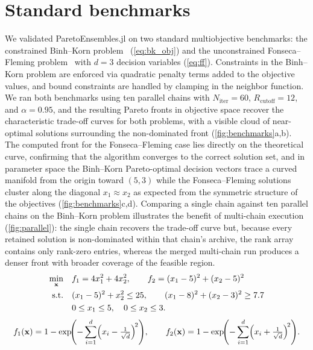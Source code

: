 \documentclass[preprint,review,12pt]{elsarticle}
\begin{document}
\clearpage
\section{Standard benchmarks}\label{sec:si_benchmarks}
We validated ParetoEnsembles.jl on two standard multiobjective benchmarks: the constrained Binh--Korn problem~\cite{Binh1997} (\cref{eq:bk_obj}) and the unconstrained Fonseca--Fleming problem~\cite{Fonseca1995} with $d = 3$ decision variables (\cref{eq:ff}).
Constraints in the Binh--Korn problem are enforced via quadratic penalty terms added to the objective values, and bound constraints are handled by clamping in the neighbor function.
We ran both benchmarks using ten parallel chains with $N_{\text{iter}} = 60$, $R_{\text{cutoff}} = 12$, and $\alpha = 0.95$, and the resulting Pareto fronts in objective space recover the characteristic trade-off curves for both problems, with a visible cloud of near-optimal solutions surrounding the non-dominated front (\cref{fig:benchmarks}a,b).
The computed front for the Fonseca--Fleming case lies directly on the theoretical curve, confirming that the algorithm converges to the correct solution set, and in parameter space the Binh--Korn Pareto-optimal decision vectors trace a curved manifold from the origin toward $(5, 3)$ while the Fonseca--Fleming solutions cluster along the diagonal $x_1 \approx x_2$ as expected from the symmetric structure of the objectives (\cref{fig:benchmarks}c,d).
Comparing a single chain against ten parallel chains on the Binh--Korn problem illustrates the benefit of multi-chain execution (\cref{fig:parallel}): the single chain recovers the trade-off curve but, because every retained solution is non-dominated within that chain's archive, the rank array contains only rank-zero entries, whereas the merged multi-chain run produces a denser front with broader coverage of the feasible region.
\begin{align}
  \min_{\mathbf{x}} \quad & f_1 = 4x_1^2 + 4x_2^2, \qquad f_2 = (x_1 - 5)^2 + (x_2 - 5)^2 \label{eq:bk_obj} \\
  \text{s.t.} \quad & (x_1 - 5)^2 + x_2^2 \leq 25, \qquad (x_1 - 8)^2 + (x_2 - 3)^2 \geq 7.7 \notag \\
  & 0 \leq x_1 \leq 5, \quad 0 \leq x_2 \leq 3. \notag
\end{align}
\begin{equation}\label{eq:ff}
  f_1(\mathbf{x}) = 1 - \exp\!\Biggl(-\sum_{i=1}^{d}\Bigl(x_i - \tfrac{1}{\sqrt{d}}\Bigr)^{\!2}\Biggr), \qquad
  f_2(\mathbf{x}) = 1 - \exp\!\Biggl(-\sum_{i=1}^{d}\Bigl(x_i + \tfrac{1}{\sqrt{d}}\Bigr)^{\!2}\Biggr).
\end{equation}
\end{document}
